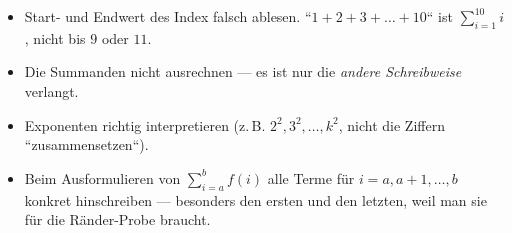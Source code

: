 \begin{achtung}
\begin{itemize}
  \item Start- und Endwert des Index falsch ablesen. ``$1+2+3+\dots+10$``
        ist $\sum_{i=1}^{10}i$, nicht bis $9$ oder $11$.
  \item Die Summanden nicht ausrechnen --- es ist nur die \emph{andere
        Schreibweise} verlangt.
  \item Exponenten richtig interpretieren (z.\,B. $2^2,3^2,\dots,k^2$,
        nicht die Ziffern ``zusammensetzen``).
  \item Beim Ausformulieren von $\sum_{i=a}^{b}f(i)$ alle Terme für
        $i=a,a+1,\dots,b$ konkret hinschreiben --- besonders den ersten
        und den letzten, weil man sie für die Ränder-Probe braucht.
\end{itemize}
\end{achtung}
